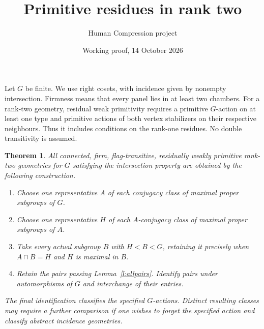 \documentclass[11pt]{article}
\title{Primitive residues in rank two}
\author{Human Compression project}
\date{Working proof, 14 October 2026}
\newtheorem{theorem}{Theorem}
\begin{document}
\maketitle

Let $G$ be finite. We use right cosets, with incidence given by nonempty
intersection. Firmness means that every panel lies in at least two chambers.
For a rank-two geometry, residual weak primitivity requires a primitive
$G$-action on at least one type and primitive actions of both vertex
stabilizers on their respective neighbours. Thus it includes conditions
on the rank-one residues. No double transitivity is assumed.

\begin{theorem}\label{t:complete}
All connected, firm, flag-transitive, residually weakly primitive
rank-two geometries for $G$ satisfying the intersection property are
obtained by the following construction.
\begin{enumerate}
\item Choose one representative $A$ of each conjugacy class of maximal
proper subgroups of $G$.
\item Choose one representative $H$ of each $A$-conjugacy class of maximal
proper subgroups of $A$.
\item Take every actual subgroup $B$ with $H<B<G$, retaining it precisely
when $A\cap B=H$ and $H$ is maximal in $B$.
\item Retain the pairs passing Lemma~\ref{l:allpairs}. Identify pairs under
automorphisms of $G$ and interchange of their entries.
\end{enumerate}
The final identification classifies the specified $G$-actions. Distinct
resulting classes may require a further comparison if one wishes to forget
the specified action and classify abstract incidence geometries.
\end{theorem}
\end{document}
